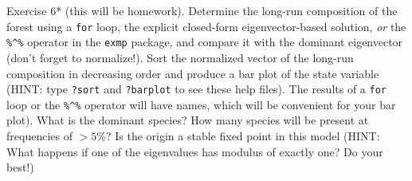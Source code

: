 \documentclass[11pt]{article}\usepackage[]{graphicx}\usepackage[]{color}
\newcommand{\code}[1]{{\tt #1}}
\numberwithin{exercise}{section}
\begin{document}
Exercise 6* (this will be homework).  Determine the long-run
composition of the forest using a \code{for} loop, the explicit
closed-form eigenvector-based solution, \emph{or} the \verb+%^%+
operator in the \code{exmp} package, and compare it with the dominant
eigenvector (don't forget to normalize!).  Sort the normalized vector
of the long-run composition in decreasing order and produce a bar plot
of the state variable (HINT: type \code{?sort} and \code{?barplot} to
see these help files). The results of a \code{for} loop or the
\verb+%^%+ operator will have names, which will be convenient for your
bar plot). What is the dominant species?  How many species will be
present at frequencies of $>5\%$? Is the origin a stable fixed point
in this model (HINT: What happens if one of the eigenvalues has
modulus of exactly one? Do your best!)



\end{document}
